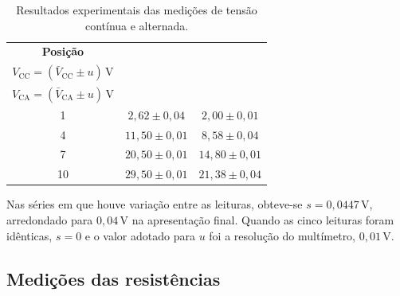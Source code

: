 \documentclass[a4paper,12pt]{article}
\begin{document}
\begin{table}[H]
  \centering
  \caption{Resultados experimentais das medições de tensão contínua e alternada.}
  \label{tab:resultados_tensoes}
  \medskip

  \begin{tabular}{ccc}
    \toprule
    \textbf{Posição}
    & \shortstack{\textbf{Tensão contínua}\\
      $V_{\mathrm{CC}}=(\bar V_{\mathrm{CC}}\pm u)\,\mathrm{V}$}
    & \shortstack{\textbf{Tensão alternada}\\
      $V_{\mathrm{CA}}=(\bar V_{\mathrm{CA}}\pm u)\,\mathrm{V}$} \\
    \midrule
    1  & $2{,}62\pm0{,}04$  & $2{,}00\pm0{,}01$  \\
    4  & $11{,}50\pm0{,}01$ & $8{,}58\pm0{,}04$  \\
    7  & $20{,}50\pm0{,}01$ & $14{,}80\pm0{,}01$ \\
    10 & $29{,}50\pm0{,}01$ & $21{,}38\pm0{,}04$ \\
    \bottomrule
  \end{tabular}
\end{table}

Nas séries em que houve variação entre as leituras, obteve-se
$s=0{,}0447\,\mathrm{V}$, arredondado para $0{,}04\,\mathrm{V}$ na
apresentação final. Quando as cinco leituras foram idênticas, $s=0$ e o valor
adotado para $u$ foi a resolução do multímetro, $0{,}01\,\mathrm{V}$.

\subsection{Medições das resistências}
\end{document}

